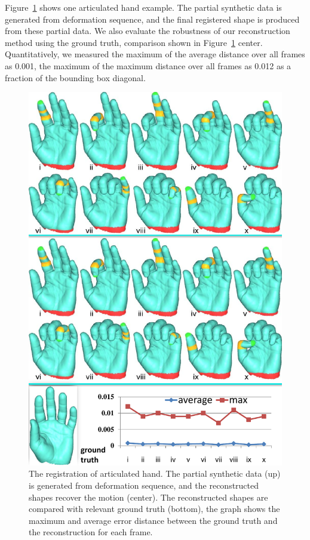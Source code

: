 Figure~\ref{fig:3DHand} shows one articulated hand example.
The partial synthetic data is generated from deformation sequence, and the final registered shape is produced from these partial data.
We also evaluate the robustness of our reconstruction method using the ground truth, comparison shown in Figure~\ref{fig:3DHand} center.
Quantitatively, we measured the maximum of the average distance over all frames as 0.001, 
the maximum of the maximum distance over all frames as 0.012 as a fraction of the bounding box diagonal.

\begin{figure}
\centering
  \includegraphics[width=0.99\linewidth]{figures/3DHand.pdf}
  \caption{The registration of articulated hand. 
  The partial synthetic data (up) is generated from deformation sequence, and the reconstructed shapes recover the motion (center).
  The reconstructed shapes are compared with relevant ground truth (bottom), 
  the graph shows the maximum and average error distance between the ground truth and the reconstruction for each frame.}
\label{fig:3DHand}
\end{figure}

